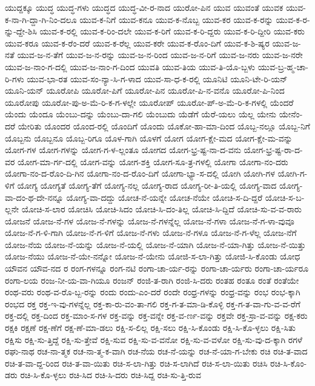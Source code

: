 {ಯುದ್ದಕ್ಕೂ
ಯುದ್ಧ
ಯುದ್ಧ-ಗಳು
ಯುದ್ಧದ
ಯುದ್ಧ-ವೀ-ರ-ನಾದ
ಯುರೋ-ಪಿನ
ಯುವ
ಯುವಂತೆ
ಯುವಕ
ಯುವ-ಕ-ನಾ-ಗಿ-ದ್ದಾ-ಗಿ-ನಿಂ-ದಲೂ
ಯುವ-ಕ-ನಿಗೆ
ಯುವ-ಕನೂ
ಯುವ-ಕ-ನೊಬ್ಬ
ಯುವ-ಕರ
ಯುವ-ಕ-ರನ್ನು
ಯುವ-ಕ-ರ-ನ್ನು-ದ್ದೇ-ಶಿಸಿ
ಯುವ-ಕ-ರಲ್ಲಿ
ಯುವ-ಕ-ರಿಂ-ದಲೇ
ಯುವ-ಕ-ರಿಗೆ
ಯುವ-ಕ-ರಿ-ದ್ದರು
ಯುವ-ಕ-ರಿ-ದ್ದೀರಿ
ಯುವ-ಕರು
ಯುವ-ಕರೂ
ಯುವ-ಕ-ರೆಂ-ದರೆ
ಯುವ-ಕ-ರೆಲ್ಲ
ಯುವ-ಕರೇ
ಯುವ-ಕ-ರೊಂ-ದಿಗೆ
ಯುವ-ಕ-ಶಿ-ಷ್ಯರ
ಯುವ-ಜ-ನತೆ
ಯುವ-ಜ-ನ-ತೆಗೆ
ಯುವ-ಜ-ನ-ರನ್ನು
ಯುವ-ಜ-ನ-ರಿಂದ
ಯುವ-ಜ-ನ-ರಿಗೆ
ಯುವ-ಜ-ನರು
ಯುವ-ಜ-ನರೇ
ಯುವ-ಜ-ನಾಂ-ಗ-ದಲ್ಲಿ
ಯುವ-ಜ-ನಾಂ-ಗ-ದಿಂದ
ಯುವತಿ
ಯುವ-ತಿಯ
ಯುವ-ತಿ-ಯೊ-ಬ್ಬಳು
ಯುವ-ಬ್ರ-ಹ್ಮ-ಚಾ-ರಿ-ಗಳು
ಯುವ-ಭಾ-ರತ
ಯುವ-ಸಂ-ನ್ಯಾ-ಸಿ-ಗ-ಳಾದ
ಯುವ-ಸಾ-ಧ-ಕ-ರಲ್ಲಿ
ಯೂನಿಟಿ
ಯೂನಿ-ಟೇ-ರಿ-ಯನ್
ಯೂನಿ-ಯನ್
ಯೂರೋಪಿ
ಯೂರೋ-ಪಿಗೆ
ಯೂರೋ-ಪಿನ
ಯೂರೋ-ಪಿ-ನ-ವನೊ
ಯೂರೋ-ಪಿ-ನಿಂದ
ಯೂರೋಪು
ಯೂರೋ-ಪು-ಅ-ಮೆ-ರಿ-ಕ-ಗ-ಳಲ್ಲೇ
ಯೂರೋಪ್
ಯೂರೋ-ಪ್-ಅ-ಮೆ-ರಿ-ಕ-ಗಳಲ್ಲಿ
ಯೆಂದರೆ
ಯೆಂದು
ಯೆಂದೂ
ಯೆಂಬು-ದನ್ನು
ಯೆಂಬು-ದಾ-ಗಲಿ
ಯೆಂಬುದು
ಯೆಡೆಗೆ
ಯೆರೆ-ಯಲು
ಯೆಲ್ಲ
ಯೇನು
ಯೇನೆಂ-ದರೆ
ಯೇರಿತು
ಯೊಂದರ
ಯೊಂದ-ರಲ್ಲಿ
ಯೊಂದಿಗೆ
ಯೊಂದು
ಯೊಕೋ-ಹಾ-ಮಾ-ದಿಂದ
ಯೊಬ್ಬ-ನಲ್ಲೂ
ಯೊಬ್ಬ-ನಿಗೆ
ಯೊಬ್ಬನು
ಯೊಬ್ಬನೂ
ಯೊಬ್ಬ-ರಿಗೂ
ಯೊಳ-ಗಾಗಿ
ಯೊಳಗೆ
ಯೋಗ
ಯೋಗ-ಕ್ಷೇ-ಮದ
ಯೋಗ-ಕ್ಷೇ-ಮ-ವನ್ನು
ಯೋಗ-ಗಳ
ಯೋಗ-ಗಳನ್ನು
ಯೋಗ-ಗ-ಳ-ಲ್ಲಂತೂ
ಯೋಗದ
ಯೋಗ-ಭ್ರ-ಷ್ಟ-ನಾ-ದ-ವನು
ಯೋಗ-ಭ್ರ-ಷ್ಟ-ರಾ-ದ-ವರ
ಯೋಗ-ಮಾ-ರ್ಗ-ದಲ್ಲಿ
ಯೋಗ-ವನ್ನು
ಯೋಗ-ಶಕ್ತಿ
ಯೋಗ-ಸೂ-ತ್ರ-ಗಳಲ್ಲಿ
ಯೋಗಾ
ಯೋಗಾ-ನಂ-ದರು
ಯೋಗಾ-ನಂ-ದ-ರೊಂ-ದಿ-ಗಿನ
ಯೋಗಾ-ನಂ-ದ-ರೊಂ-ದಿಗೆ
ಯೋಗಾ-ಭ್ಯಾ-ಸ-ದಲ್ಲಿ
ಯೋಗಿ
ಯೋಗಿ-ಗಳ
ಯೋಗಿ-ಗ-ಳಿಗೆ
ಯೋಗ್ಯ
ಯೋಗ್ಯತೆ
ಯೋಗ್ಯ-ತೆಗೆ
ಯೋಗ್ಯ-ನಲ್ಲ
ಯೋಗ್ಯ-ರಾದ
ಯೋಗ್ಯ-ರೀ-ತಿ-ಯಲ್ಲಿ
ಯೋಗ್ಯ-ವಾದ
ಯೋಗ್ಯ-ವಾ-ದಂ-ಥ-ದೇ-ನನ್ನೂ
ಯೋಗ್ಯ-ವಾ-ದದ್ದು
ಯೋಚ-ನೆ-ಯನ್ನೇ
ಯೋಚ-ನೆಯೇ
ಯೋಚಿ-ಸ-ದಿ-ದ್ದರೆ
ಯೋಚಿ-ಸ-ಬ-ಲ್ಲನೇ
ಯೋಚಿ-ಸ-ಲಾರ
ಯೋಚಿಸಿ
ಯೋಚಿ-ಸಿದಂ
ಯೋಚಿ-ಸಿ-ದಂ-ತಿಲ್ಲ
ಯೋಚಿ-ಸಿ-ದ್ದಿದೆ
ಯೋಚಿ-ಸು-ವ-ವ-ರಾರು
ಯೋಜನೆ
ಯೋಜ-ನೆ-ಗಳ
ಯೋಜ-ನೆ-ಗಳನ್ನು
ಯೋಜ-ನೆ-ಗಳನ್ನೆಲ್ಲ
ಯೋಜ-ನೆ-ಗಳಾ
ಯೋಜ-ನೆ-ಗ-ಳಾ-ವುವೂ
ಯೋಜ-ನೆ-ಗ-ಳಿ-ಗಾಗಿ
ಯೋಜ-ನೆ-ಗ-ಳಿಗೆ
ಯೋಜ-ನೆ-ಗಳು
ಯೋಜ-ನೆ-ಗಳೂ
ಯೋಜ-ನೆ-ಗ-ಳೆಲ್ಲ
ಯೋಜ-ನೆಗೆ
ಯೋಜ-ನೆಯ
ಯೋಜ-ನೆ-ಯನ್ನು
ಯೋಜ-ನೆ-ಯಲ್ಲಿ
ಯೋಜ-ನೆ-ಯಾಗಿ
ಯೋಜ-ನೆ-ಯಾ-ಗಿತ್ತು
ಯೋಜ-ನೆ-ಯಿತ್ತು
ಯೋಜ-ನೆಯು
ಯೋಜ-ನೆ-ಯೇ-ನನ್ನೋ
ಯೋಜ-ನೆ-ಯೇನು
ಯೋಜಿ-ಸ-ಲಾ-ಗಿತ್ತು
ಯೋಜಿ-ಸಿ-ಕೊಂಡು
ಯೋಧ
ಯೌವನ
ಯೌವ-ನದ
ರ
ರಂಗ-ಗಳನ್ನೂ
ರಂಗ-ನಟಿ
ರಂಗಾ-ಚಾ-ರ್ಯ-ರನ್ನು
ರಂಗಾ-ಚಾ-ರ್ಯರು
ರಂಗಾ-ಚಾ-ರ್ಯರೂ
ರಂಗಾ-ಲಯ
ರಂಜ-ನೀ-ಯ-ವಾ-ಗಿಯೂ
ರಂಜನ್
ರಂಜಿ-ತ-ರಾಗಿ
ರಂಜಿ-ಸಿ-ದರು
ರಂತಹ
ರಂತೂ
ರಂತೆ
ರಂತೆಯೇ
ರಂಥ-ವರು
ರಂಥ-ವ-ರೊ-ಬ್ಬ-ರನ್ನು
ರಂದು
ರಂದು-ಎಂ-ದರೆ
ರಂದೇ
ರಂಧ್ರ-ಗಳನ್ನು
ರಂಧ್ರ-ವನ್ನು
ರಂಭ
ರಂಭ-ಕ್ಕಾಗಿ
ರಂಭದ
ರಕ್ತ
ರಕ್ತ-ಇ-ವು-ಗಳನ್ನೆಲ್ಲ
ರಕ್ತ-ಕಾ-ರು-ವಂ-ತಾ-ಗಲಿ
ರಕ್ತ-ಗ-ತ-ಮಾ-ಡಿ-ಕೊಳ್ಳಿ
ರಕ್ತ-ಗ-ತ-ವಾ-ಗು-ವ-ವ-ರೆಗೆ
ರಕ್ತ-ದಲ್ಲಿ
ರಕ್ತ-ದಿಂದ
ರಕ್ತ-ಮಾಂ-ಸ-ಗಳ
ರಕ್ತ-ವನ್ನು
ರಕ್ತ-ವನ್ನೇ
ರಕ್ತ-ವ-ರ್ಣ-ವನ್ನು
ರಕ್ತವೇ
ರಕ್ತ-ಸ್ರಾ-ವ-ವನ್ನು
ರಕ್ಷ-ಕರು
ರಕ್ಷಕಿ
ರಕ್ಷಣೆ
ರಕ್ಷ-ಣೆಗೆ
ರಕ್ಷ-ಣೆ-ಮಾ-ಡಲು
ರಕ್ಷಿ-ಸ-ಲಿಲ್ಲ
ರಕ್ಷಿ-ಸಲು
ರಕ್ಷಿ-ಸಿ-ಕೊಂಡು
ರಕ್ಷಿ-ಸಿ-ಕೊ-ಳ್ಳಲು
ರಕ್ಷಿ-ಸಿತು
ರಕ್ಷಿಸು
ರಕ್ಷಿ-ಸು-ತ್ತಿದ್ದೆ
ರಕ್ಷಿ-ಸು-ತ್ತೇವೆ
ರಕ್ಷಿ-ಸುವ
ರಕ್ಷಿ-ಸು-ವ-ವನೋ
ರಕ್ಷಿ-ಸು-ವ-ವಳೋ
ರಕ್ಷಿ-ಸು-ವು-ದ-ಕ್ಕಾಗಿ
ರಗಳೆ
ರಘು-ನಾಥ
ರಚ-ನಾ-ತ್ಮಕ
ರಚ-ನಾ-ತ್ಮ-ಕ-ವಾಗಿ
ರಚ-ನೆಯ
ರಚ-ನೆ-ಯನ್ನು
ರಚ-ನೆ-ಯಾ-ಗ-ಬೇಕು
ರಚಿ
ರಚಿ-ತ-ವಾದ
ರಚಿ-ತ-ವಾ-ದ್ದ-ರಿಂದ
ರಚಿ-ತ-ವಾ-ಯಿತು
ರಚಿ-ಸ-ಲಾ-ಗಿತ್ತು
ರಚಿ-ಸ-ಲಾಗಿದೆ
ರಚಿ-ಸ-ಲಾ-ಯಿತು
ರಚಿಸಿ
ರಚಿ-ಸಿ-ಕೊಂ-ಡರು
ರಚಿ-ಸಿ-ಕೊ-ಳ್ಳಲು
ರಚಿ-ಸಿದ
ರಚಿ-ಸಿ-ದರು
ರಚಿ-ಸಿದ್ದ
ರಚಿ-ಸು-ತ್ತಿ-ರುವ
}
